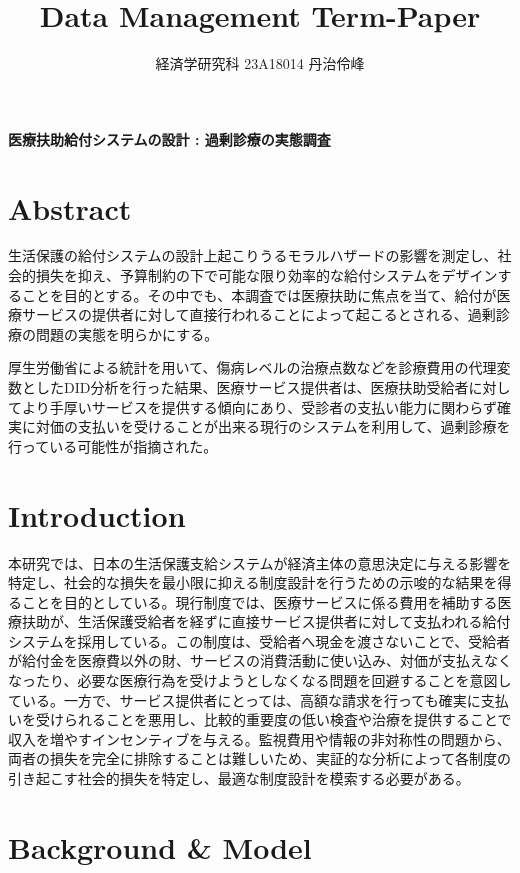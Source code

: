 \documentclass{jsarticle}
\begin{document}
\title{Data Management Term-Paper}
\author{経済学研究科 23A18014 丹治伶峰}
\date{}
\maketitle

\Large

\textbf{医療扶助給付システムの設計 : 過剰診療の実態調査}

\large

\section{Abstract}

生活保護の給付システムの設計上起こりうるモラルハザードの影響を測定し、社会的損失を抑え、予算制約の下で可能な限り効率的な給付システムをデザインすることを目的とする。その中でも、本調査では医療扶助に焦点を当て、給付が医療サービスの提供者に対して直接行われることによって起こるとされる、過剰診療の問題の実態を明らかにする。

厚生労働省による統計を用いて、傷病レベルの治療点数などを診療費用の代理変数としたDID分析を行った結果、医療サービス提供者は、医療扶助受給者に対してより手厚いサービスを提供する傾向にあり、受診者の支払い能力に関わらず確実に対価の支払いを受けることが出来る現行のシステムを利用して、過剰診療を行っている可能性が指摘された。

\section{Introduction}

本研究では、日本の生活保護支給システムが経済主体の意思決定に与える影響を特定し、社会的な損失を最小限に抑える制度設計を行うための示唆的な結果を得ることを目的としている。現行制度では、医療サービスに係る費用を補助する医療扶助が、生活保護受給者を経ずに直接サービス提供者に対して支払われる給付システムを採用している。この制度は、受給者へ現金を渡さないことで、受給者が給付金を医療費以外の財、サービスの消費活動に使い込み、対価が支払えなくなったり、必要な医療行為を受けようとしなくなる問題を回避することを意図している。一方で、サービス提供者にとっては、高額な請求を行っても確実に支払いを受けられることを悪用し、比較的重要度の低い検査や治療を提供することで収入を増やすインセンティブを与える。監視費用や情報の非対称性の問題から、両者の損失を完全に排除することは難しいため、実証的な分析によって各制度の引き起こす社会的損失を特定し、最適な制度設計を模索する必要がある。

\section{Background \& Model}
\end{document}
